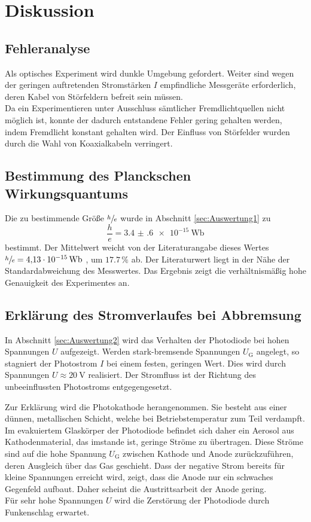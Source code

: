 \section{Diskussion}
\label{sec:Diskussion}
\subsection{Fehleranalyse} %
\label{sub:Diskussion1}
Als optisches Experiment wird dunkle Umgebung gefordert.
Weiter sind wegen der geringen auftretenden Stromstärken $I$ empfindliche Messgeräte erforderlich, deren Kabel von Störfeldern befreit sein müssen.\\
Da ein Experimentieren unter Ausschluss sämtlicher Fremdlichtquellen nicht möglich ist, konnte der dadurch entstandene Fehler gering gehalten werden, indem Fremdlicht konstant gehalten wird.
Der Einfluss von Störfelder wurden durch die Wahl von Koaxialkabeln verringert.
\subsection{Bestimmung des Planckschen Wirkungsquantums} %
\label{sub:Diskussion2}
Die zu bestimmende Größe $\sfrac{h}{e}$ wurde in Abschnitt \ref{sec:Auswertung1} zu 
\begin{equation}
	\frac{h}{e}=\SI{3.4(6)e-15}{\weber}
\end{equation}
bestimmt.
Der Mittelwert weicht von der Literaturangabe dieses Wertes $\sfrac{h}{e}=\SI{4.13e-15}{\weber}$ \cite{texas_instruments1},\cite{texas_instruments2} um $17.7\,\%$ 
ab. Der Literaturwert liegt in der Nähe der Standardabweichung des Messwertes.
Das Ergebnis zeigt die verhältnismäßig hohe Genauigkeit des Experimentes an.
\subsection{Erklärung des Stromverlaufes bei Abbremsung} %
\label{sub:Diskussion3}
In Abschnitt \ref{sec:Auswertung2} wird das Verhalten der Photodiode bei hohen Spannungen $U$ aufgezeigt.
Werden stark-bremsende Spannungen $U_\text{G}$ angelegt, so stagniert der Photostrom $I$ bei einem festen, geringen Wert.
Dies wird durch Spannungen $U\approx\SI{20}{\volt}$ realisiert.
Der Stromfluss ist der Richtung des unbeeinflussten Photostroms entgegengesetzt.

Zur Erklärung wird die Photokathode herangenommen. 
Sie besteht aus einer dünnen, metallischen Schicht, welche bei Betriebstemperatur zum Teil verdampft.
Im evakuiertem Glaskörper der Photodiode befindet sich daher ein Aerosol aus Kathodenmaterial, das imstande ist, 
geringe Ströme zu übertragen. 
Diese Ströme sind auf die hohe Spannung $U_\text{G}$ zwischen Kathode und Anode zurückzuführen, deren Ausgleich über das Gas geschieht.
Dass der negative Strom bereits für kleine Spannungen erreicht wird, zeigt, dass die Anode nur ein schwaches Gegenfeld aufbaut.
Daher scheint die Austrittsarbeit der Anode gering.\\
Für sehr hohe Spannungen $U$ wird die Zerstörung der Photodiode durch Funkenschlag erwartet.

